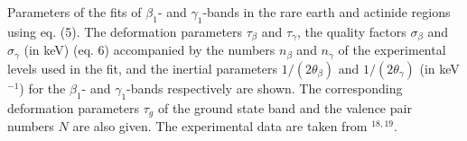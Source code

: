\par\vfill\eject

{ {\eightrm Parameters of the fits of
${\beta}_1$- and ${\gamma}_1$-bands in the rare earth and actinide regions
using eq.  (5).  The deformation parameters ${\tau}_{\beta}$ and
${\tau}_{\gamma}$, the quality factors ${\sigma}_{\beta}$ and
${\sigma}_{\gamma}$ (in keV) (eq. 6) accompanied by the numbers $n_{\beta}$
and $n_{\gamma}$ of the experimental levels used in the fit, and the inertial
parameters $1/(2{\theta}_{\beta})$ and $1/(2{\theta}_{\gamma})$ (in
keV$^{-1}$) for the ${\beta}_1$- and ${\gamma}_1$-bands respectively are
shown.  The corresponding deformation parameters ${\tau}_g$ of the ground
state band and the valence pair numbers $N$ are also given.  The experimental
data are taken from $^{18,19}$.}}

